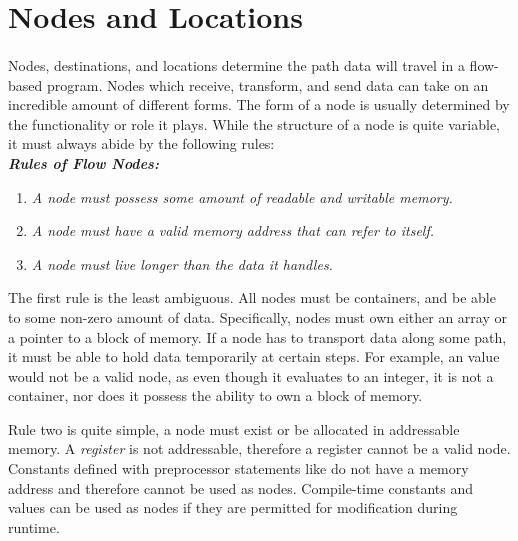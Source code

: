 \section{Nodes and Locations}

\paragraph{  } Nodes, destinations, and locations determine the path data will travel in a flow-based program. Nodes which receive, transform, and send data can take on an incredible amount of different forms. The form of a node is usually determined by the functionality or role it plays. While the structure of a node is quite variable, it must always abide by the following rules: \\

\textbf{\emph{Rules of Flow Nodes:}}

\begin{enumerate}
\item \emph{A node must possess some amount of readable and writable memory.}
\item \emph{A node must have a valid memory address that can refer to itself.}
\item \emph{A node must live longer than the data it handles.}
\end{enumerate}

\par The first rule is the least ambiguous. All nodes must be containers, and be able to some non-zero amount of data. Specifically, nodes must own either an array or a pointer to a block of memory. If a node has to transport data along some path, it must be able to hold data temporarily at certain steps. For example, an  value would not be a valid node, as even though it evaluates to an integer, it is not a container, nor does it possess the ability to own a block of memory.

\par Rule two is quite simple, a node must exist or be allocated in addressable memory. A \emph{register} is not addressable, therefore a register cannot be a valid node. Constants defined with preprocessor statements like  do not have a memory address and therefore cannot be used as nodes. Compile-time constants and values can be used as nodes if they are permitted for modification during runtime.